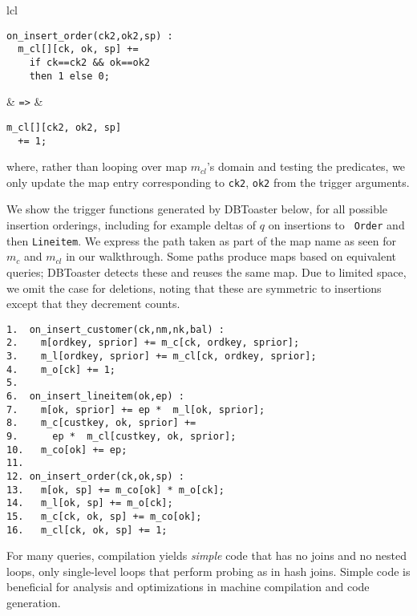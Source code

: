 \vspace{1mm}
\begin{tabular}{lcl}
\hspace{-6mm}
\begin{minipage}{1.65in}
{\footnotesize
\begin{verbatim}
on_insert_order(ck2,ok2,sp) :
  m_cl[][ck, ok, sp] +=
    if ck==ck2 && ok==ok2
    then 1 else 0;
\end{verbatim}
}
\end{minipage}
&
{\tt =>}
&
\hspace{-3.5mm}
\begin{minipage}{1.6in}
{\footnotesize
\begin{verbatim}
m_cl[][ck2, ok2, sp]
  += 1;
\end{verbatim}
}
\end{minipage}
\end{tabular}

\vspace{1mm}
\noindent where, rather than looping over map $m_{cl}$'s domain and testing the
predicates, we only update the map entry corresponding to {\tt ck2}, {\tt ok2}
from the trigger arguments.

We show the trigger functions generated by DBToaster below, for all possible
insertion orderings, including for example deltas of $q$ on insertions to {\tt
Order} and then {\tt Lineitem}.  We express the path taken as part of the map
name as seen for $m_{c}$ and $m_{cl}$ in our walkthrough. Some paths produce
maps based on equivalent queries; DBToaster detects these and reuses the same
map.  Due to limited space, we omit the case for deletions, noting that these
are symmetric to insertions except that they decrement counts.


{\footnotesize
\begin{verbatim}
1.  on_insert_customer(ck,nm,nk,bal) :
2.    m[ordkey, sprior] += m_c[ck, ordkey, sprior];
3.    m_l[ordkey, sprior] += m_cl[ck, ordkey, sprior];
4.    m_o[ck] += 1;
5. 
6.  on_insert_lineitem(ok,ep) :
7.    m[ok, sprior] += ep *  m_l[ok, sprior];
8.    m_c[custkey, ok, sprior] +=
9.      ep *  m_cl[custkey, ok, sprior];
10.   m_co[ok] += ep;
11.
12. on_insert_order(ck,ok,sp) :
13.   m[ok, sp] += m_co[ok] * m_o[ck]; 
14.   m_l[ok, sp] += m_o[ck];
15.   m_c[ck, ok, sp] += m_co[ok];
16.   m_cl[ck, ok, sp] += 1;
\end{verbatim}
}

For many queries, compilation yields \textit{simple} code that has no joins
and no nested loops, only single-level loops that perform probing as
in hash joins.
Simple code is beneficial for analysis and optimizations in machine
compilation and code generation.

